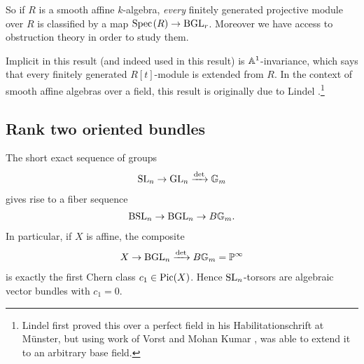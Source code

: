 \documentclass[11pt,openany]{book}
\begin{document}
So if $R$ is a smooth affine $k$-algebra, \textit{every} finitely generated projective module over $R$ is classified by a map $\text{Spec}\hspace{0.1em}(R) \to \mathrm{BGL}_r$. Moreover we have access to obstruction theory in order to study them.

Implicit in this result (and indeed used in this result) is $\mathbb{A}^1$-invariance, which says that every finitely generated $R[t]$-module is extended from $R$. In the context of smooth affine algebras over a field, this result is originally due to Lindel \cite{Lindel81}.\footnote{Lindel first proved this over a perfect field in his Habilitationschrift at M\"unster, but using work of Vorst and Mohan Kumar \cite{Vorst}, was able to extend it to an arbitrary base field.}

\subsection{Rank two oriented bundles}

The short exact sequence of groups
\begin{align*}
    \mathrm{SL}_n \to \mathrm{GL}_n \xrightarrow{\det} \mathbb{G}_m
\end{align*}
gives rise to a fiber sequence
\begin{align*}
    \mathrm{BSL}_n \to \mathrm{BGL}_n \to B \mathbb{G}_m.
\end{align*}
In particular, if $X$ is affine, the composite
\begin{align*}
    X \to \mathrm{BGL}_n \xrightarrow{\det} B \mathbb{G}_m = \mathbb{P}^\infty
\end{align*}
is exactly the first Chern class $c_1 \in \mathrm{Pic}(X)$. Hence $\mathrm{SL}_n$-torsors are algebraic vector bundles with $c_1 = 0$.
\end{document}
